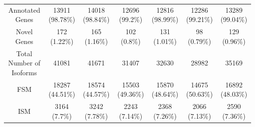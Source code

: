 \begin{landscape}
\begin{table}[]
{\begin{tabular}{@{}ccccccc@{}}
		Annotated Genes                     & 13911 (98.78\%)                                                          & 14018 (98.84\%)                                                          & 12696 (99.2\%)                                                           & 12816 (98.99\%)                                                         & 12286 (99.21\%)                                                          & 13289 (99.04\%)                                                          \\
		Novel Genes                         & 172 (1.22\%)                                                             & 165 (1.16\%)                                                             & 102 (0.8\%)                                                              & 131 (1.01\%)                                                            & 98 (0.79\%)                                                              & 129 (0.96\%)                                                             \\
		Total Number of Isoforms            & 41081                                                                    & 41671                                                                    & 31407                                                                    & 32630                                                                   & 28982                                                                    & 35169                                                                    \\
		FSM                                 & 18287 (44.51\%)                                                          & 18574 (44.57\%)                                                          & 15503 (49.36\%)                                                          & 15870 (48.64\%)                                                         & 14675 (50.63\%)                                                          & 16892 (48.03\%)                                                          \\
		ISM                                 & 3164 (7.7\%)                                                             & 3242 (7.78\%)                                                            & 2243 (7.14\%)                                                            & 2368 (7.26\%)                                                           & 2066 (7.13\%)                                                            & 2590 (7.36\%)                                                            \\

\end{tabular}}
\end{table}
\end{landscape}

